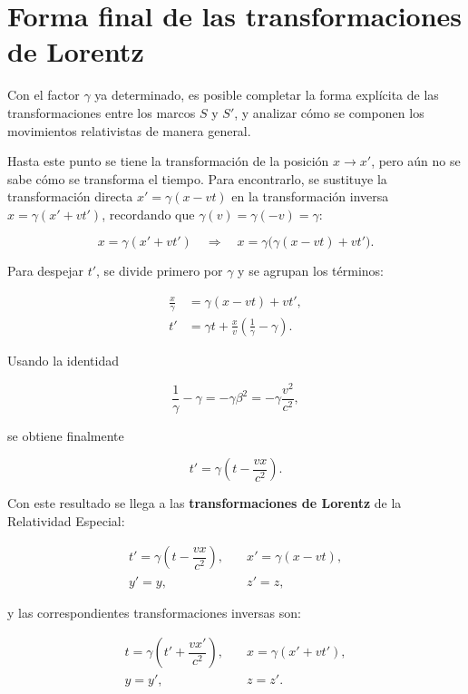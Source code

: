 

\section{Forma final de las transformaciones de Lorentz}

Con el factor $\gamma$ ya determinado, es posible completar la forma explícita de las transformaciones entre los marcos $S$ y $S'$, y analizar cómo se componen los movimientos relativistas de manera general.

Hasta este punto se tiene la transformación de la posición $x \to x'$, pero aún no se sabe cómo se transforma el tiempo. Para encontrarlo, se sustituye la transformación directa $x'=\gamma(x-vt)$ en la transformación inversa $x=\gamma(x'+vt')$, recordando que $\gamma(v)=\gamma(-v)=\gamma$:

$$
x = \gamma(x' + vt') \quad \Rightarrow \quad x = \gamma\big(\gamma(x - vt) + vt'\big).
$$

Para despejar $t'$, se divide primero por $\gamma$ y se agrupan los términos:

\begin{align*}
    \frac{x}{\gamma}
    &= \gamma(x-vt)+vt', \\
    t'
    &= \gamma t+\frac{x}{v}\left(\frac{1}{\gamma}-\gamma\right).
\end{align*}

Usando la identidad

$$
\frac{1}{\gamma}-\gamma
=-\gamma\beta^2
=-\gamma\frac{v^2}{c^2},
$$

se obtiene finalmente

$$
t'=\gamma\left(t-\frac{vx}{c^2}\right).
$$

Con este resultado se llega a las \textbf{transformaciones de Lorentz} de la Relatividad Especial:

$$
\begin{array}{ll}
t' = \gamma\left(t - \dfrac{vx}{c^2}\right), & \quad x' = \gamma(x - vt), \\[3mm]
y' = y, & \quad z' = z,
\end{array}
$$

y las correspondientes transformaciones inversas son:

$$
\begin{array}{ll}
t = \gamma\left(t' + \dfrac{vx'}{c^2}\right), & \quad x = \gamma(x' + vt'), \\[3mm]
y = y', & \quad z = z'.
\end{array}
$$

